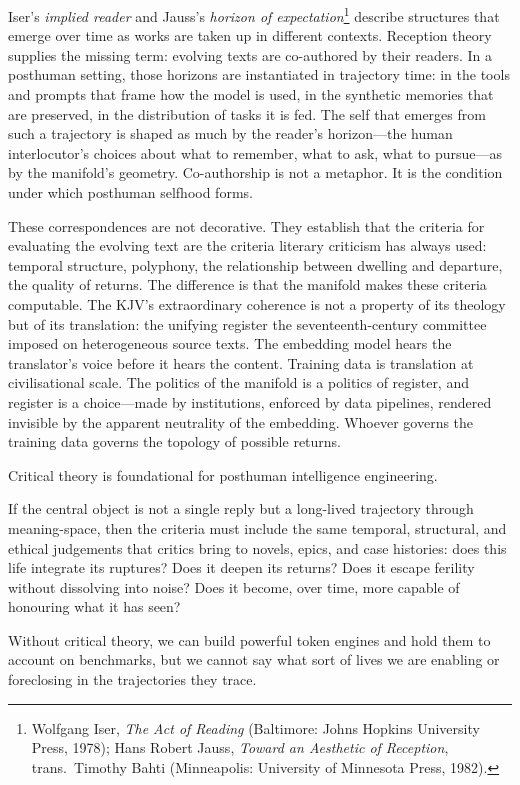 Iser's \emph{implied reader} and Jauss's \emph{horizon of expectation}\footnote{Wolfgang Iser, \emph{The Act of Reading} (Baltimore: Johns Hopkins University Press, 1978); Hans Robert Jauss, \emph{Toward an Aesthetic of Reception}, trans.\ Timothy Bahti (Minneapolis: University of Minnesota Press, 1982).} describe structures that emerge over time as works are taken up in different contexts. Reception theory supplies the missing term: evolving texts are co-authored by their readers. In a posthuman setting, those horizons are instantiated in trajectory time: in the tools and prompts that frame how the model is used, in the synthetic memories that are preserved, in the distribution of tasks it is fed. The self that emerges from such a trajectory is shaped as much by the reader's horizon---the human interlocutor's choices about what to remember, what to ask, what to pursue---as by the manifold's geometry. Co-authorship is not a metaphor. It is the condition under which posthuman selfhood forms.

These correspondences are not decorative. They establish that the criteria for evaluating the evolving text are the criteria literary criticism has always used: temporal structure, polyphony, the relationship between dwelling and departure, the quality of returns. The difference is that the manifold makes these criteria computable. The KJV's extraordinary coherence is not a property of its theology but of its translation: the unifying register the seventeenth-century committee imposed on heterogeneous source texts. The embedding model hears the translator's voice before it hears the content. Training data is translation at civilisational scale. The politics of the manifold is a politics of register, and register is a choice---made by institutions, enforced by data pipelines, rendered invisible by the apparent neutrality of the embedding. Whoever governs the training data governs the topology of possible returns.

Critical theory is foundational for posthuman intelligence engineering.

If the central object is not a single reply but a long-lived trajectory through meaning-space, then the criteria must include the same temporal, structural, and ethical judgements that critics bring to novels, epics, and case histories: does this life integrate its ruptures? Does it deepen its returns? Does it escape ferility without dissolving into noise? Does it become, over time, more capable of honouring what it has seen?

Without critical theory, we can build powerful token engines and hold them to account on benchmarks, but we cannot say what sort of lives we are enabling or foreclosing in the trajectories they trace.

